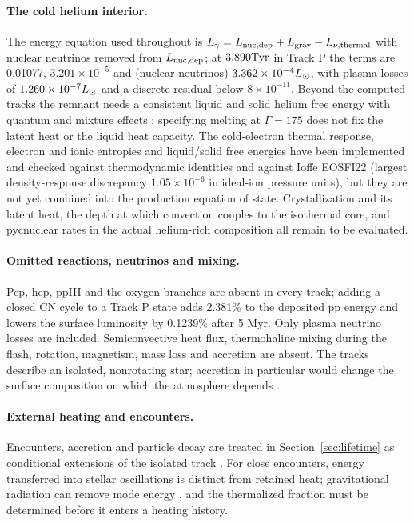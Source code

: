 \paragraph{The cold helium interior.}
The energy equation used throughout is
$L_\gamma=L_{\rm nuc,dep}+L_{\rm grav}-L_{\nu,\rm thermal}$ with nuclear
neutrinos removed from $L_{\rm nuc,dep}$; at $3.890\mathrm{Tyr}$ in Track P the
terms are 0.01077, $3.201\times10^{-5}$ and (nuclear neutrinos)
$3.362\times10^{-4}L_\odot$, with plasma losses of $1.260\times10^{-7}L_\odot$ and
a discrete residual below $8\times10^{-11}$. Beyond the computed tracks the
remnant needs a consistent liquid and solid helium free energy with quantum
and mixture effects \cite{baiko22}: specifying melting at $\Gamma=175$ does
not fix the latent heat or the liquid heat capacity. The cold-electron
thermal response, electron and ionic entropies and liquid/solid free
energies have been implemented and checked against thermodynamic identities
and against Ioffe EOSFI22 (largest density-response discrepancy
$1.05\times10^{-6}$ in ideal-ion pressure units), but they are not yet
combined into the production equation of state. Crystallization and its
latent heat, the depth at which convection couples to the isothermal core,
and pycnuclear rates in the actual helium-rich composition \cite{gasques05}
all remain to be evaluated.

\paragraph{Omitted reactions, neutrinos and mixing.}
Pep, hep, ppIII and the oxygen branches are absent in every track; adding a
closed CN cycle to a Track P state adds 2.381\% to the deposited pp energy
and lowers the surface luminosity by 0.1239\% after 5 Myr. Only plasma
neutrino losses are included. Semiconvective heat flux, thermohaline mixing
during the flash, rotation, magnetism, mass loss and accretion are absent.
The tracks describe an isolated, nonrotating star; accretion in particular
would change the surface composition on which the atmosphere depends
\cite{bauer19}.

\paragraph{External heating and encounters.}
Encounters, accretion and particle decay are treated in
Section~\ref{sec:lifetime} as conditional extensions of the isolated track
\cite{adams97}. For close encounters, energy transferred into stellar
oscillations is distinct from retained heat; gravitational radiation can
remove mode energy \cite{rathore05}, and the thermalized fraction must be
determined before it enters a heating history.
